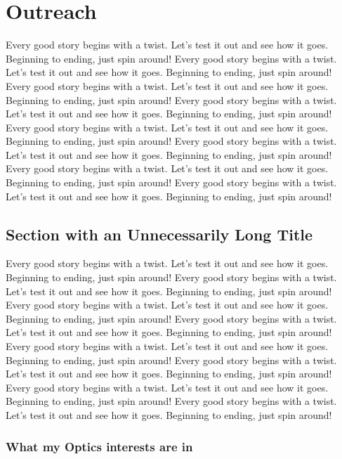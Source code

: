 \chapter{Outreach}

Every good story begins with a twist. Let's test it out and see how it goes. Beginning to ending, just spin around! Every good story begins with a twist. Let's test it out and see how it goes. Beginning to ending, just spin around! Every good story begins with a twist. Let's test it out and see how it goes. Beginning to ending, just spin around! Every good story begins with a twist. Let's test it out and see how it goes. Beginning to ending, just spin around! Every good story begins with a twist. Let's test it out and see how it goes. Beginning to ending, just spin around! Every good story begins with a twist. Let's test it out and see how it goes. Beginning to ending, just spin around! Every good story begins with a twist. Let's test it out and see how it goes. Beginning to ending, just spin around! Every good story begins with a twist. Let's test it out and see how it goes. Beginning to ending, just spin around!

\section[What my Optics Studies have been]{Section with an Unnecessarily Long Title}

Every good story begins with a twist. Let's test it out and see how it goes. Beginning to ending, just spin around! Every good story begins with a twist. Let's test it out and see how it goes. Beginning to ending, just spin around! Every good story begins with a twist. Let's test it out and see how it goes. Beginning to ending, just spin around! Every good story begins with a twist. Let's test it out and see how it goes. Beginning to ending, just spin around! Every good story begins with a twist. Let's test it out and see how it goes. Beginning to ending, just spin around! Every good story begins with a twist. Let's test it out and see how it goes. Beginning to ending, just spin around! Every good story begins with a twist. Let's test it out and see how it goes. Beginning to ending, just spin around! Every good story begins with a twist. Let's test it out and see how it goes. Beginning to ending, just spin around!

\subsection{What my Optics interests are in}

